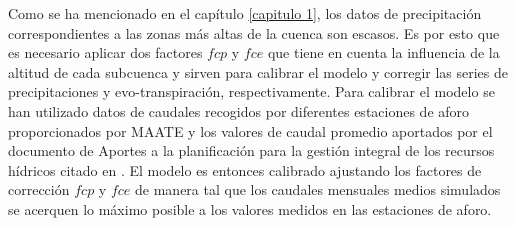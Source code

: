 Como se ha mencionado en el capítulo \ref{capitulo 1}, los datos de precipitación correspondientes a las zonas más 
altas de la cuenca son escasos. Es por esto que es necesario aplicar  dos factores $fcp$ y $fce$ 
que tiene en cuenta la influencia de la altitud de cada subcuenca y
 sirven para calibrar el modelo y corregir las series de precipitaciones y evo-transpiración, respectivamente.
 Para calibrar el modelo se han utilizado datos de caudales recogidos por diferentes estaciones de aforo proporcionados por
 MAATE \cite{MAATE} y los valores de caudal promedio aportados por el documento de Aportes a la planificación para 
 la gestión integral de los recursos hídricos citado en \cite{Rodriguez}. 
 El modelo es entonces calibrado ajustando los factores de corrección $fcp$ y $fce$ de manera tal que los caudales mensuales medios 
 simulados se acerquen lo máximo posible a los valores medidos en las estaciones de aforo.
 
 
 
 
 
 
 
 

